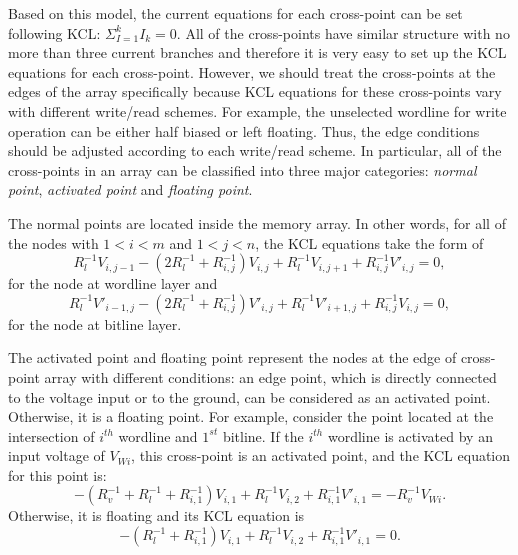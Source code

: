 Based on this model, the current equations for each cross-point can be set
following KCL: $ {\Sigma}_{I=1}^kI_k=0.$ All of the cross-points have
similar structure with no more than three current branches and therefore
it is very easy to set up the KCL equations for each cross-point. However,
we should treat the cross-points at the edges of the array specifically
because KCL equations for these cross-points vary with different
write/read schemes. For example, the unselected wordline for write
operation can be either half biased or left floating. Thus, the edge
conditions should be adjusted according to each write/read scheme. In
particular, all of the cross-points in an array can be classified into
three major categories: \emph{normal point}, \emph{activated point} and
\emph{floating point}.

The normal points are located inside the memory array. In other words, for
all of the nodes with $1<i<m$ and $1<j<n$, the KCL equations take the form
of
\begin{equation}\label{equ:KCL1}
R_l^{-1}V_{i,j-1} -(2R_l^{-1}+R_{i,j}^{-1})V_{i,j}+ R_l^{-1}V_{i,j+1}+R_{i,j}^{-1}V'_{i,j}=0,
\end{equation}
for the node at wordline layer and
\begin{equation}\label{equ:KCL2}
R_l^{-1}V'_{i-1,j} -(2R_l^{-1}+R_{i,j}^{-1})V'_{i,j}+ R_l^{-1}V'_{i+1,j}+R_{i,j}^{-1}V_{i,j}=0,
\end{equation}
for the node at bitline layer.

The activated point and floating point represent the nodes at the edge of
cross-point array with different conditions: an edge point, which is
directly connected to the voltage input or to the ground, can be
considered as an activated point. Otherwise, it is a floating point. For
example, consider the point located at the intersection of $i^{th}$
wordline and $1^{st}$ bitline. If the $i^{th}$ wordline is activated by an
input voltage of $V_{Wi}$, this cross-point is an activated point, and the
KCL equation for this point is:
\begin{equation}\label{equ:KCL3}
-(R_v^{-1}+R_l^{-1}+R_{i,1}^{-1})V_{i,1}+ R_l^{-1}V_{i,2}+R_{i,1}^{-1}V'_{i,1}=-R_v^{-1}V_{Wi}.
\end{equation}
Otherwise, it is floating and its KCL equation is
\begin{equation}\label{equ:KCL4}
-(R_l^{-1}+R_{i,1}^{-1})V_{i,1}+ R_l^{-1}V_{i,2}+R_{i,1}^{-1}V'_{i,1}=0.
\end{equation}

